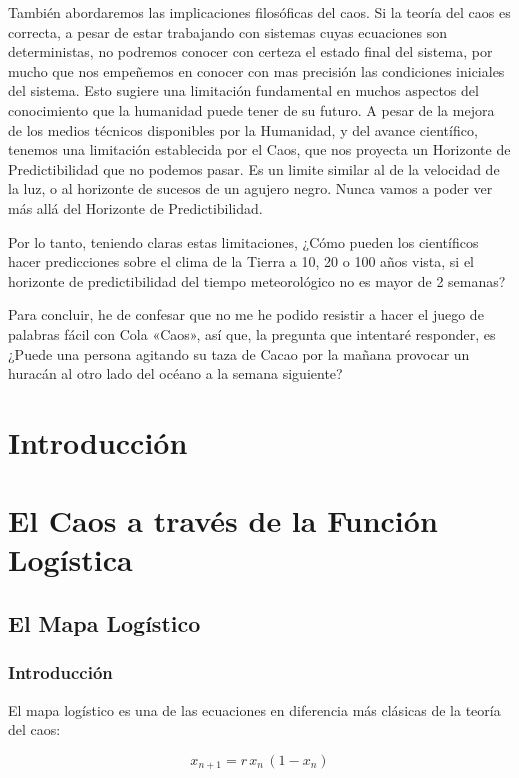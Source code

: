 \documentclass[
  11pt,
  a4paper,
  DIV=11,
  numbers=noendperiod]{scrreprt}
\begin{document}
También abordaremos las implicaciones filosóficas del caos. Si la teoría
del caos es correcta, a pesar de estar trabajando con sistemas cuyas
ecuaciones son deterministas, no podremos conocer con certeza el estado
final del sistema, por mucho que nos empeñemos en conocer con mas
precisión las condiciones iniciales del sistema. Esto sugiere una
limitación fundamental en muchos aspectos del conocimiento que la
humanidad puede tener de su futuro. A pesar de la mejora de los medios
técnicos disponibles por la Humanidad, y del avance científico, tenemos
una limitación establecida por el Caos, que nos proyecta un Horizonte de
Predictibilidad que no podemos pasar. Es un limite similar al de la
velocidad de la luz, o al horizonte de sucesos de un agujero negro.
Nunca vamos a poder ver más allá del Horizonte de Predictibilidad.

Por lo tanto, teniendo claras estas limitaciones, ¿Cómo pueden los
científicos hacer predicciones sobre el clima de la Tierra a 10, 20 o
100 años vista, si el horizonte de predictibilidad del tiempo
meteorológico no es mayor de 2 semanas?

Para concluir, he de confesar que no me he podido resistir a hacer el
juego de palabras fácil con Cola «Caos», así que, la pregunta que
intentaré responder, es ¿Puede una persona agitando su taza de Cacao por
la mañana provocar un huracán al otro lado del océano a la semana
siguiente?

\part{Introducción}

\part{El Caos a través de la Función Logística}

\chapter{El Mapa Logístico}\label{el-mapa-loguxedstico}

\section{Introducción}\label{introducciuxf3n-1}

El mapa logístico es una de las ecuaciones en diferencia más clásicas de
la teoría del caos:

\[
x_{n+1} = r\,x_n\,(1 - x_n)
\]
\end{document}
